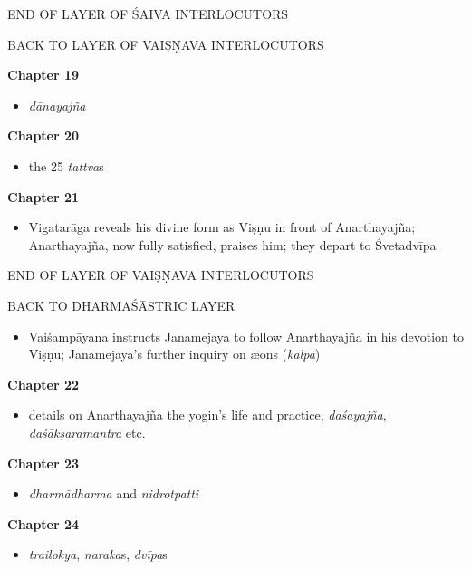 \documentclass[11pt]{book} %
\newcommand{\skt}[1]{\textit{#1}}
\begin{document}
\begin{center}
 END OF  LAYER OF ŚAIVA INTERLOCUTORS
\end{center}

\begin{center}
BACK TO LAYER OF VAIṢṆAVA INTERLOCUTORS
\end{center}


\bigskip

\textbf{Chapter 19}
\begin{itemize}
\item \skt{dānayajña}
\end{itemize}

\textbf{Chapter 20}
\begin{itemize}
\item the 25 \skt{tattva}s
\end{itemize}

\pagebreak

\textbf{Chapter 21}
\begin{itemize}
\item Vigatarāga reveals his divine form as Viṣṇu in front of Anarthayajña;
Anarthayajña, now fully satisfied, praises him; they depart to Śvetadvīpa
\end{itemize}

\begin{center}
END OF LAYER OF VAIṢṆAVA INTERLOCUTORS
\end{center}

\begin{center}
BACK TO DHARMAŚĀSTRIC LAYER
\end{center}

\begin{itemize}
\item Vaiśampāyana instructs Janamejaya to follow Anarthayajña in
his devotion to Viṣṇu; Janamejaya's further inquiry on \ae ons (\skt{kalpa})
\end{itemize}


\textbf{Chapter 22}
\begin{itemize}
\item details on Anarthayajña the  yogin's life and practice, \skt{daśayajña}, \skt{daśākṣa\-ra\-mantra} etc. 
\end{itemize}

\textbf{Chapter 23}
\begin{itemize}
\item \skt{dharmādharma} and \skt{nidrotpatti}
\end{itemize}

\textbf{Chapter 24}
\begin{itemize}
\item \skt{trailokya}, \skt{naraka}s, \skt{dvīpa}s
\end{itemize}
\end{document}
